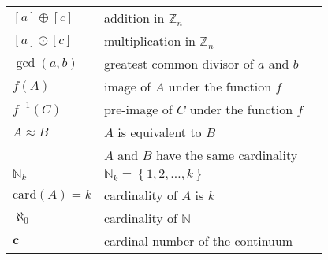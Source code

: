 \begin{tabular}{p{1in} p{2.5in} l}
$\left[ a \right] \oplus \left[ c \right]$ &  addition in $\mathbb{Z}_n$  &  \pageref{sym:addmodn}  \\
$\left[ a \right] \odot \left[ c \right]$ &  multiplication in $\mathbb{Z}_n$  &  
\pageref{sym:addmodn}  \\
%
%
$\gcd ( {a, b} )$  &  greatest common divisor of $a$ and $b$  &  \pageref{sym:gcd} \\
$f ( A )$        &  image of $A$ under the function $f$  &  \pageref{sym:fofA} \\
$f^{-1} ( C )$   &  pre-image of $C$ under the function $f$ & \pageref{sym:preimage} \\
$A \approx B$               &  $A$ is equivalent to $B$              &  \pageref{sym:AequivB} \\
                            &  $A$ and $B$ have the same cardinality &  \\
$\mathbb{N}_k$     &  $\mathbb{N}_k = \left\{ 1, 2, \ldots, k \right\}$ & \pageref{sym:firstk}  \\
$\text{card} ( A ) = k$  &  cardinality of $A$ is $k$    &  \pageref{sym:cardk}  \\
$\aleph_0$               &  cardinality of $\mathbb{N}$            &  \pageref{sym:aleph0}  \\
$\boldsymbol{c}$         &  cardinal number of the continuum      &  \pageref{sym:continuum}  \\

\end{tabular}

\endinput
